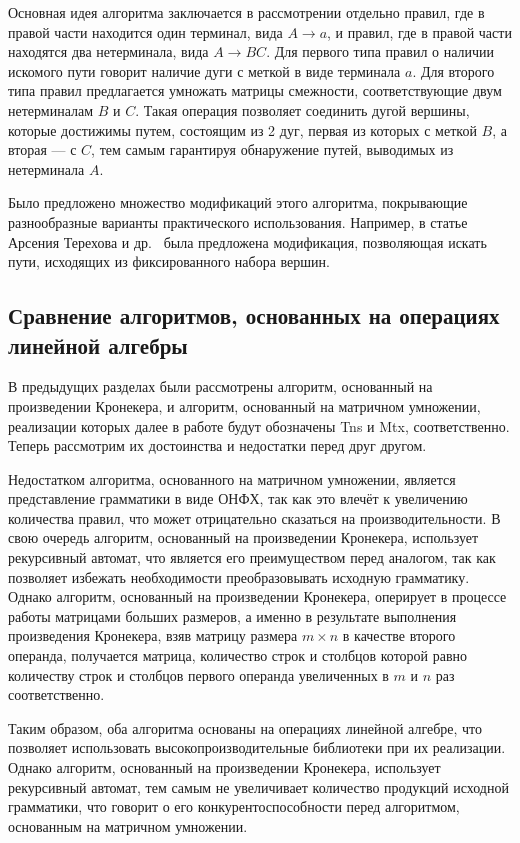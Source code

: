 Основная идея алгоритма заключается в рассмотрении отдельно правил, где в правой части находится один терминал, вида $A \rightarrow a$, и правил, где в правой части находятся два нетерминала, вида $A \rightarrow BC$. Для первого типа правил о наличии искомого пути говорит наличие дуги с меткой в виде терминала $a$. Для второго типа правил предлагается умножать матрицы смежности, соответствующие двум нетерминалам $B$ и $C$. Такая операция позволяет соединить дугой вершины, которые достижимы путем, состоящим из 2 дуг, первая из которых с меткой $B$, а вторая --- с $C$, тем самым гарантируя обнаружение путей, выводимых из нетерминала $A$.

Было предложено множество модификаций этого алгоритма, покрывающие разнообразные варианты практического использования. Например, в статье Арсения Терехова и др.~\cite{ms-matrix} была предложена модификация, позволяющая искать пути, исходящих из фиксированного набора вершин.

\subsection{Сравнение алгоритмов, основанных на операциях линейной алгебры}

В предыдущих разделах были рассмотрены алгоритм, основанный на произведении Кронекера, и алгоритм, основанный на матричном умножении, реализации которых далее в работе будут обозначены Tns и Mtx, соответственно. Теперь рассмотрим их достоинства и недостатки перед друг другом.

Недостатком алгоритма, основанного на матричном умножении, является представление грамматики в виде ОНФХ, так как это влечёт к увеличению количества правил, что может отрицательно сказаться на производительности. В свою очередь алгоритм, основанный на произведении Кронекера, использует рекурсивный автомат, что является его преимуществом перед аналогом, так как позволяет избежать необходимости преобразовывать исходную грамматику. Однако алгоритм, основанный на произведении Кронекера, оперирует в процессе работы матрицами больших размеров, а именно в результате выполнения произведения Кронекера, взяв матрицу размера $m \times n$ в качестве второго операнда, получается матрица, количество строк и столбцов которой равно количеству строк и столбцов первого операнда увеличенных в $m$ и $n$ раз соответственно. 

Таким образом, оба алгоритма основаны на операциях линейной алгебре, что позволяет использовать высокопроизводительные библиотеки при их реализации. Однако алгоритм, основанный на произведении Кронекера, использует рекурсивный автомат, тем самым не увеличивает количество продукций исходной грамматики, что говорит о его конкурентоспособности перед алгоритмом, основанным на матричном умножении.

